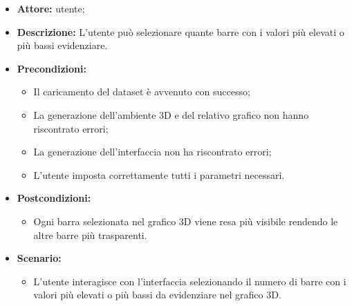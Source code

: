 \begin{itemize}    
    \item \textbf{Attore:} utente;
    \item \textbf{Descrizione:} L'utente può selezionare quante barre con i valori più elevati o più bassi evidenziare.
    \item \textbf{Precondizioni:}    
        \begin{itemize}
            \item Il caricamento del dataset è avvenuto con successo;
            \item La generazione dell'ambiente 3D e del relativo grafico non hanno riscontrato errori;
            \item La generazione dell'interfaccia non ha riscontrato errori;
            \item L'utente imposta correttamente tutti i parametri necessari.
        \end{itemize}    
    \item \textbf{Postcondizioni:}
        \begin{itemize}
            \item Ogni barra selezionata nel grafico 3D viene resa più visibile rendendo le altre barre più trasparenti.
        \end{itemize}    
    \item \textbf{Scenario:} 
        \begin{itemize}
            \item L'utente interagisce con l'interfaccia selezionando il numero di barre con i valori più elevati o più bassi da evidenziare nel grafico 3D.
        \end{itemize}
\end{itemize}
